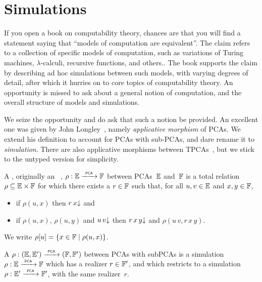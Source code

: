 \section{Simulations}
\label{sec:simulations}%

If you open a book on computability theory, chances are that you will find a statement saying that ``models of computation are equivalent''. The claim refers to a collection of specific models of computation, such as variations of Turing machines, $\lambda$-calculi, recursive functions, and others.. The book supports the claim by describing ad hoc simulations between such models, with varying degrees of detail, after which it hurries on to core topics of computability theory. An opportunity is missed to ask about a general notion of computation, and the overall structure of models and simulations.

We seize the opportunity and do ask that such a notion be provided. An excellent one was given by John Longley~, namely \emph{applicative morphism} of PCAs. We extend his definition to account for PCAs with sub-PCAs, and dare rename it to \emph{simulation}. There are also applicative morphisms between TPCAs~\cite{longley99:_match}, but we stick to the untyped version for simplicity.

\begin{definition}
  \label{def:simulation}%
  A , originally an ~\cite{Longley:94},
  $\rho: {\mathbb{E}} \xrightarrow{\scriptscriptstyle\mathsf{\ PCA\ }}{} {\mathbb{F}}$ between PCAs~${\mathbb{E}}$ and~${\mathbb{F}}$ is a total relation $\rho
  \subseteq {\mathbb{E}} \times {\mathbb{F}}$ for which there exists a  $r \in {\mathbb{F}}$
  such that, for all $u, v \in {\mathbb{E}}$ and $x, y \in {\mathbb{F}}$,
  \begin{itemize}
  \item if $\rho(u, x)$ then $r \, x{\downarrow}$ and
  \item if $\rho(u, x)$, $\rho(u, y)$ and $u \, v{\downarrow}$ then
    $r \, x \, y{\downarrow}$ and $\rho(u \, v, r \, x \, y)$.
  \end{itemize}
  We write $\rho[u] = \{x \in {\mathbb{F}} \mid \rho(u, x)\}$.

  A  $\rho: ({\mathbb{E}}, {\mathbb{E}'}) \xrightarrow{\scriptscriptstyle\mathsf{\ PCA\ }}{} ({\mathbb{F}}, {\mathbb{F}'})$ between PCAs with subPCAs is a simulation
  $\rho : {\mathbb{E}} \xrightarrow{\scriptscriptstyle\mathsf{\ PCA\ }}{} {\mathbb{F}}$ which has a realizer $r \in {\mathbb{F}'}$, and which restricts to a simulation
  $\rho : {\mathbb{E}'} \xrightarrow{\scriptscriptstyle\mathsf{\ PCA\ }}{} {\mathbb{F}'}$, with the same realizer~$r$.
\end{definition}

